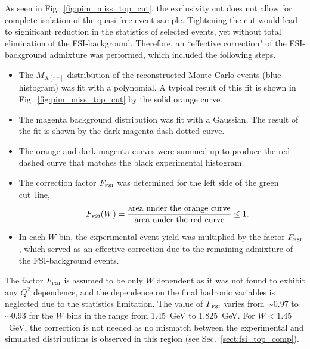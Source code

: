 \documentclass[prc,twocolumn,superscriptaddress,showpacs,amssymb,amsmath,amsfonts,aps,nofootinbib]{revtex4-1}
\begin{document}
As seen in Fig.\!~\ref{fig:pim_miss_top_cut}, the exclusivity cut does not allow for complete isolation of the quasi-free event sample. Tightening the cut would lead to significant reduction in the statistics of selected events, yet without total elimination of the FSI-background. Therefore, an ``effective correction" of the FSI-background admixture was performed, which included the following steps.



\begin{itemize}
\item The $M_{X[\pi^{-}]}$ distribution of the reconstructed Monte Carlo events (blue histogram) was fit with a polynomial. A typical result of this fit is shown in Fig.\!~\ref{fig:pim_miss_top_cut} by the solid orange curve.
\item The magenta background distribution was fit with a Gaussian. The result of the fit is shown by the dark-magenta dash-dotted curve.
\item The orange and dark-magenta curves were summed up to produce the red dashed curve that matches the black experimental histogram.
\item The correction factor $F_{\text{\tiny FSI}}$ was determined for the left side of the green cut~line,
\begin{equation}
\begin{aligned}
~~~~F_{\text{\tiny FSI}}(W) = \frac{\text{area~under~the~orange~curve}}{\text{area~under~the~red~curve}} \leq 1.\label{eq:fsi_corr_fact}
\end{aligned}
\end{equation}%
\item In each $W$ bin, the experimental event yield was multiplied by the factor $F_{\text{\tiny FSI}}$, which served as an effective correction due to the remaining admixture of the FSI-background events.
\end{itemize}




The factor $F_{\text{\tiny FSI}}$ is assumed to be only $W$ dependent as it was not found to exhibit any $Q^{2}$ dependence, and the dependence on the final hadronic variables is neglected due to the statistics limitation. The value of $F_{\text{\tiny FSI}}$ varies from $\sim$0.97 to $\sim$0.93 for the $W$ bins in the range from 1.45~GeV to 1.825~GeV. For $W < 1.45$~GeV, the correction is not needed as no mismatch between the experimental and simulated distributions is observed in this region (see Sec.\!~\ref{sect:fsi_top_comp}).
\end{document}
